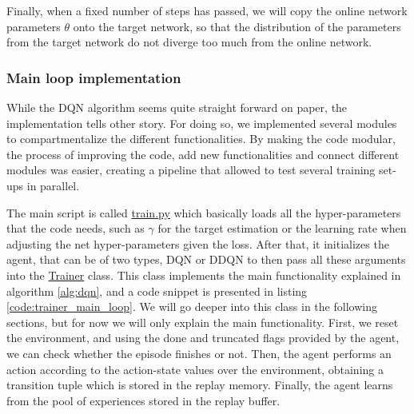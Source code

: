 Finally, when a fixed number of steps has passed, we will copy the online network parameters $\theta$ onto the target network, so that the distribution of the parameters from the target network do not diverge too much from the online network.

\subsubsection{Main loop implementation}
While the DQN algorithm seems quite straight forward on paper, the implementation tells other story. For doing so, we implemented several modules to compartmentalize the different functionalities. By making the code modular, the process of improving the code, add new functionalities and connect different modules was easier, creating a pipeline that allowed to test several training set-ups in parallel.

The main script is called \href{https://github.com/Javimh18/DL_TFM/blob/main/src/train.py}{train.py} which basically loads all the hyper-parameters that the code needs, such as $\gamma$ for the target estimation or the learning rate when adjusting the net hyper-parameters given the loss. After that, it initializes the agent, that can be of two types, DQN or DDQN to then pass all these arguments into the \href{https://github.com/Javimh18/DL_TFM/blob/main/src/trainer.py}{Trainer} class. This class implements the main functionality explained in algorithm \ref{alg:dqn}, and a code snippet is presented in listing \ref{code:trainer_main_loop}. We will go deeper into this class in the following sections, but for now we will only explain the main functionality. First, we reset the environment, and using the done and truncated flags provided by the agent, we can check whether the episode finishes or not. Then, the agent performs an action according to the action-state values over the environment, obtaining a transition tuple which is stored in the replay memory. Finally, the agent learns from the pool of experiences stored in the replay buffer.


